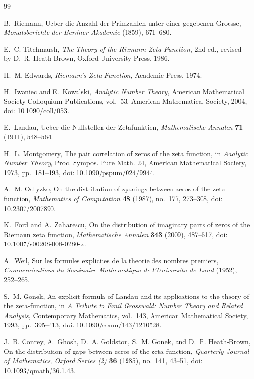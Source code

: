 \documentclass[12pt]{article}
\numberwithin{equation}{section}
\begin{document}
\begin{thebibliography}{99}

B.~Riemann,
Ueber die Anzahl der Primzahlen unter einer gegebenen Groesse,
\emph{Monatsberichte der Berliner Akademie} (1859), 671--680.

E.~C. Titchmarsh,
\emph{The Theory of the Riemann Zeta-Function},
2nd ed., revised by D.~R. Heath-Brown,
Oxford University Press, 1986.

H.~M. Edwards,
\emph{Riemann's Zeta Function},
Academic Press, 1974.

H.~Iwaniec and E.~Kowalski,
\emph{Analytic Number Theory},
American Mathematical Society Colloquium Publications, vol.~53,
American Mathematical Society, 2004,
doi: 10.1090/coll/053.

E.~Landau,
Ueber die Nullstellen der Zetafunktion,
\emph{Mathematische Annalen} \textbf{71} (1911), 548--564.

H.~L. Montgomery,
The pair correlation of zeros of the zeta function,
in \emph{Analytic Number Theory},
Proc. Sympos. Pure Math. 24,
American Mathematical Society, 1973, pp.~181--193,
doi: 10.1090/pspum/024/9944.

A.~M. Odlyzko,
On the distribution of spacings between zeros of the zeta function,
\emph{Mathematics of Computation} \textbf{48} (1987), no.~177, 273--308,
doi: 10.2307/2007890.


K.~Ford and A.~Zaharescu,
On the distribution of imaginary parts of zeros of the Riemann zeta function,
\emph{Mathematische Annalen} \textbf{343} (2009), 487--517,
doi: 10.1007/s00208-008-0280-x.

A.~Weil,
Sur les formules explicites de la theorie des nombres premiers,
\emph{Communications du Seminaire Mathematique de l'Universite de Lund} (1952), 252--265.

S.~M. Gonek,
An explicit formula of Landau and its applications to the theory of the zeta-function,
in \emph{A Tribute to Emil Grosswald: Number Theory and Related Analysis},
Contemporary Mathematics, vol.~143,
American Mathematical Society, 1993, pp.~395--413,
doi: 10.1090/conm/143/1210528.

J.~B. Conrey, A.~Ghosh, D.~A. Goldston, S.~M. Gonek, and D.~R. Heath-Brown,
On the distribution of gaps between zeros of the zeta-function,
\emph{Quarterly Journal of Mathematics, Oxford Series (2)} \textbf{36} (1985), no.~141, 43--51,
doi: 10.1093/qmath/36.1.43.


\end{thebibliography}
\end{document}
